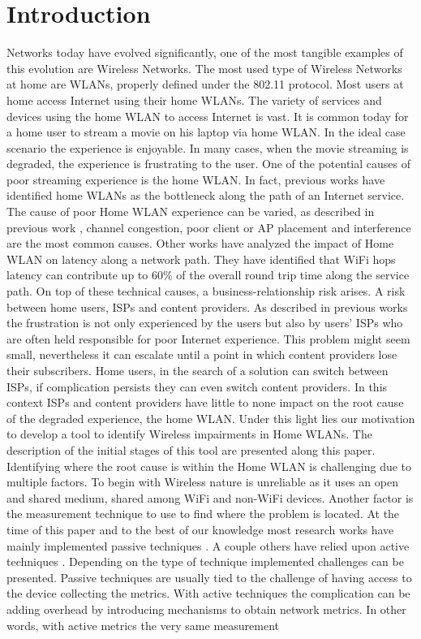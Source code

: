 \section{Introduction}\label{Introduction}


Networks today have evolved significantly, one of the most tangible examples of this evolution are Wireless Networks. The most used type of Wireless Networks at home are WLANs, properly defined under the 802.11 protocol. Most users at home access Internet using their home WLANs. The variety of services and devices using the home WLAN to access Internet is vast. It is common today for a home user to stream a movie on his laptop via home WLAN. In the ideal case scenario the experience is enjoyable. In many cases, when the movie streaming is degraded, the experience is frustrating to the user. One of the potential causes of poor streaming experience is the home WLAN. In fact, previous works \cite{homeoraccesslink} have identified home WLANs as the bottleneck along the path of an Internet service. The cause of poor Home WLAN experience can be varied, as described in previous work \cite{wislow}, channel congestion, poor client or AP placement and interference are the most common causes. Other works \cite{wifi_weakest_link} have analyzed the impact of Home WLAN on latency along a network path. They have identified that WiFi hops latency can contribute up to 60\% of the overall round trip time along the service path. On top of these technical causes, a business-relationship risk arises. A risk between home users, ISPs and content providers. As described in previous works \cite{predicting_effect_Home_Wifi} the frustration is not only experienced by the users but also by users' ISPs who are often held responsible for poor Internet experience. This problem might seem small, nevertheless it can escalate until a point in which content providers lose their subscribers. Home users, in the search of a solution can switch between ISPs, if complication persists they can even switch content providers. In this context ISPs and content providers have little to none impact on the root cause of the degraded experience, the home WLAN. Under this light lies our motivation to develop a tool to identify Wireless impairments in Home WLANs. The description of the initial stages of this tool are presented along this paper. Identifying where the root cause is within the Home WLAN is challenging due to multiple factors. To begin with Wireless nature is unreliable as it uses an open and shared medium, shared among WiFi and non-WiFi devices. Another factor is the measurement technique to use to find where the problem is located. At the time of this paper and to the best of our knowledge most research works have mainly implemented passive techniques \cite{hostview} \cite{passive_wifi_capacity_estimation}. A couple others have relied upon active techniques \cite{can_user_level_probing}. Depending on the type of technique implemented challenges can be presented. Passive techniques are usually tied to the challenge of having access to the device collecting the metrics. With active techniques the complication can be adding overhead by introducing mechanisms to obtain network metrics. In other words, with active metrics the very same measurement 